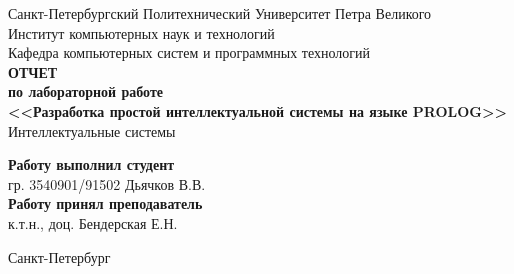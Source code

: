 \begin{titlepage}
\begin{center}
	Санкт-Петербургский Политехнический Университет Петра Великого\\[0.3cm]
	Институт компьютерных наук и технологий \\[0.3cm]
	Кафедра компьютерных систем и программных технологий\\[4cm]
	
	\textbf{ОТЧЕТ}\\ 
	\textbf{по лабораторной работе}\\[0.5cm]
	\textbf{<<Разработка простой интеллектуальной системы на языке PROLOG>>}\\[0.1cm]
	Интеллектуальные системы\\[3.0cm]
\end{center}

\begin{flushright}
	\begin{minipage}{0.5\textwidth}
		\textbf{Работу выполнил студент}\\[3mm]
		гр. 3540901/91502 \hfill \sign[1.1cm] \hfill Дьячков В.В.\\[5mm]
		\textbf{Работу принял преподаватель}\\[5mm]
		\sign[2.1cm] \hfill к.т.н., доц. Бендерская Е.Н. \\[5mm]
	\end{minipage}
\end{flushright}

\vfill

\begin{center}
	Санкт-Петербург\\[0.3cm]
	\the\year
\end{center}
\end{titlepage}

\addtocounter{page}{1}